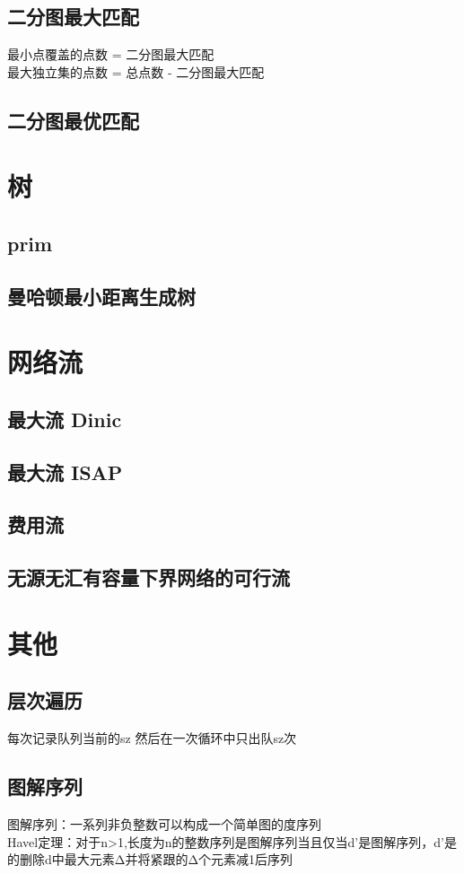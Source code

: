 \documentclass[main.tex]{subfiles}
\begin{document}
        \subsection{二分图最大匹配}
            最小点覆盖的点数 = 二分图最大匹配 \\
            最大独立集的点数 = 总点数 - 二分图最大匹配
        
        \subsection{二分图最优匹配}
            
    \section{树}
        \subsection{prim}
            
        \subsection{曼哈顿最小距离生成树}
            
    \section{网络流}
        \subsection{最大流 Dinic}
            
        \subsection{最大流 ISAP}
            
        \subsection{费用流}
            
        \subsection{无源无汇有容量下界网络的可行流}
            
    \section{其他}
        \subsection{层次遍历}
            每次记录队列当前的sz 然后在一次循环中只出队sz次
        \subsection{图解序列}
            图解序列：一系列非负整数可以构成一个简单图的度序列 \\
            Havel定理：对于n>1,长度为n的整数序列是图解序列当且仅当d'是图解序列，d'是的删除d中最大元素Δ并将紧跟的Δ个元素减1后序列	
\end{document}
